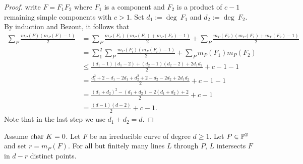      \begin{proof}
        write $F=F_1F_2$ where $F_1$ is a component and $F_2$ is a product of $c-1$ remaining simple components with $c>1$. Set $d_1:= \deg\ F_1$ and $d_2:= \deg \ F_2$. By induction and Bezout, it follows that
         \begin{align*}
             \sum_P \frac{m_P(F)(m_P(F)-1)}{2} &= \sum_P \frac{m_P(F_1)(m_P(F_1)+m_P(F_2)-1)}{2} + \sum_P \frac{m_P(F_2)(m_P(F_1)+m_P(F_2)-1)}{2}\\
             &= \sum_1^2\sum_P \frac{m_P(F_i)(m_P(F_i)-1)}{2}+ \sum_P m_P(F_1)m_P(F_2)\\
             &\leq \frac{(d_1-1)(d_1-2)+(d_2-1)(d_2-2)+2d_1d_2}{2} +c-1-1\\
             &= \frac{d_1^2+2-d_1-2d_1+d_2^2+2-d_2-2d_2+2d_1d_2}{2}+c-1-1\\
             &=\frac{(d_1+d_2)^2-(d_1+d_2)-2(d_1+d_2)+2}{2}+c-1\\
             &= \frac{(d-1)(d-2)}{2}+c-1.
         \end{align*}
         Note that in the last step we use $d_1+d_2=d$.
     \end{proof}
     \begin{proposition}\label{ThereAreInfinitelyManyLinesThroughAPointOnACurvePassingIntersectingTransversallyForTheRemainingIntersections}
         Assume $\mathrm{char} \ K=0$. Let $F$ be an irreducible curve of degree $d\geq 1$. Let $P\in \mathbb{P}^2$ and set $r=m_P(F)$. For all but finitely many lines $L$ through $P$, $L$ intersects $F$ in $d-r$ distinct points.
     \end{proposition}

